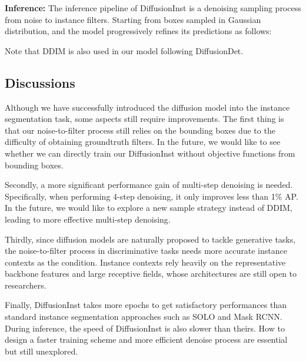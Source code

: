 \documentclass{article}
\begin{document}
\noindent \textbf{Inference:} The inference pipeline of DiffusionInst is a denoising sampling process from noise to instance filters. Starting from boxes  sampled in Gaussian distribution, and the model progressively refines its predictions as follows:

Note that DDIM is also used in our model following DiffusionDet.



\subsection{Discussions}\label{discuss}
Although we have successfully introduced the diffusion model into the instance segmentation task, some aspects still require improvements. The first thing is that our noise-to-filter process still relies on the bounding boxes due to the difficulty of obtaining groundtruth filters. In the future, we would like to see whether we can directly train our DiffusionInst without objective functions from bounding boxes. 





Secondly, a more significant performance gain of multi-step denoising is needed. Specifically, when performing 4-step denoising, it only improves less than 1\% AP. In the future, we would like to explore a new sample strategy instead of DDIM, leading to more effective multi-step denoising.

Thirdly, since diffusion models are naturally proposed to tackle generative tasks, the noise-to-filter process in discriminative tasks needs more accurate instance contexts as the condition. Instance contexts rely heavily on the representative backbone features and large receptive fields, whose architectures are still open to researchers.

Finally, DiffusionInst takes more epochs to get satisfactory performances than standard instance segmentation approaches such as SOLO and Mask RCNN. During inference, the speed of DiffusionInst is also slower than theirs. How to design a faster training scheme and more efficient denoise process are essential but still unexplored.
\end{document}
